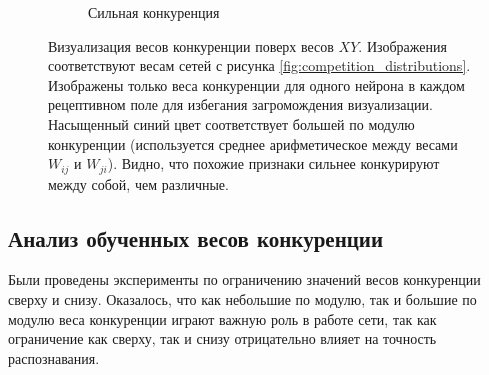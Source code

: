 \documentclass[a4paper]{article}
\begin{document}
\begin{figure}[H]
\begin{subfigure}{0.45\textwidth}
    \caption{Сильная конкуренция}
\end{subfigure}
\caption{Визуализация весов конкуренции поверх весов $XY$. Изображения соответствуют весам сетей с рисунка \ref{fig:competition_distributions}. Изображены только веса конкуренции для одного нейрона в каждом рецептивном поле для избегания загромождения визуализации. Насыщенный синий цвет соответствует большей по модулю конкуренции (используется среднее арифметическое между весами $W_{ij}$ и $W_{ji}$). Видно, что похожие признаки сильнее конкурируют между собой, чем различные.} 
\end{figure}

\subsection{Анализ обученных весов конкуренции}
Были проведены эксперименты по ограничению значений весов конкуренции сверху и снизу. Оказалось, что как небольшие по модулю, так и большие по модулю веса конкуренции играют важную роль в работе сети, так как ограничение как сверху, так и снизу отрицательно влияет на точность распознавания.
\end{document}
